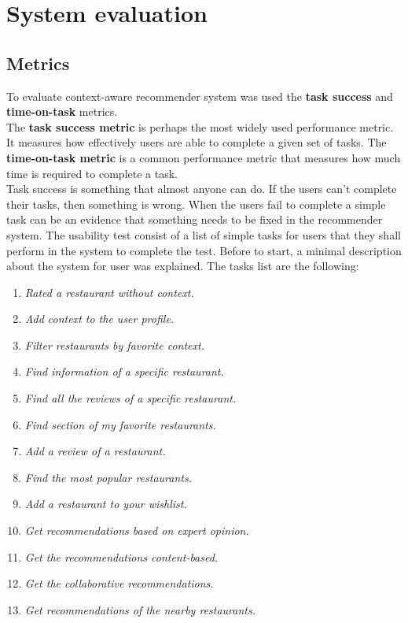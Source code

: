 \chapter{System evaluation} \label{sec:6}

\section{Metrics}

To evaluate context-aware recommender system was used the \textbf{task success}
and \textbf{time-on-task} metrics. \\ The \textbf{task success metric} is
perhaps the most widely used performance metric. It measures how effectively
users are able to complete a given set of tasks.  The \textbf{time-on-task
metric} is a common performance metric that measures how much time is required
to complete a task\cite{albert2013measuring}.\\ Task success is something that
almost anyone can do.  If the users can’t complete their tasks, then something
is wrong.  When the users fail to complete a simple task can be an evidence that
something needs to be fixed in the recommender system.  The usability test
consist of a list of simple tasks for users that they shall perform in the
system to complete the test. Before to start, a minimal description about the
system for user was explained. The tasks list are the following:
\begin{enumerate} 
\item \textit{Rated a restaurant without context.}
\item \textit{Add context to the user profile.}
\item \textit{Filter restaurants by favorite context.}
\item \textit{Find information of a specific restaurant.}
\item \textit{Find all the reviews of a specific restaurant.} 
\item \textit{Find section of my favorite restaurants.}
\item \textit{Add a review of a restaurant.}
\item \textit{Find the most popular restaurants.}
\item \textit{Add a restaurant to your wishlist.}
\item \textit{Get recommendations based on expert opinion.} 
\item \textit{Get the recommendations content-based.}
\item \textit{Get the collaborative recommendations.}
\item \textit{Get recommendations of the nearby restaurants.}
\end{enumerate} 

